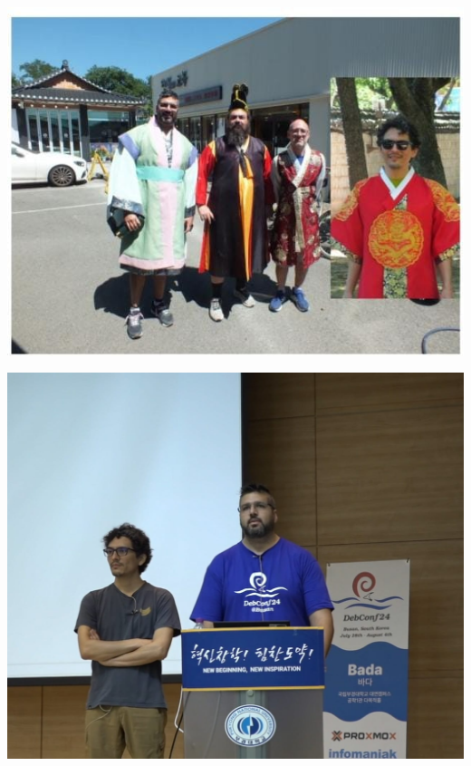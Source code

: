 \documentclass{beamer}
\begin{document}
\begin{frame}
		\includegraphics[width=0.7\linewidth]{images/developers.jpeg}
\end{frame}

\begin{frame}
		\includegraphics[width=0.7\linewidth]{images/charla_debian.jpeg}
\end{frame}
\end{document}
